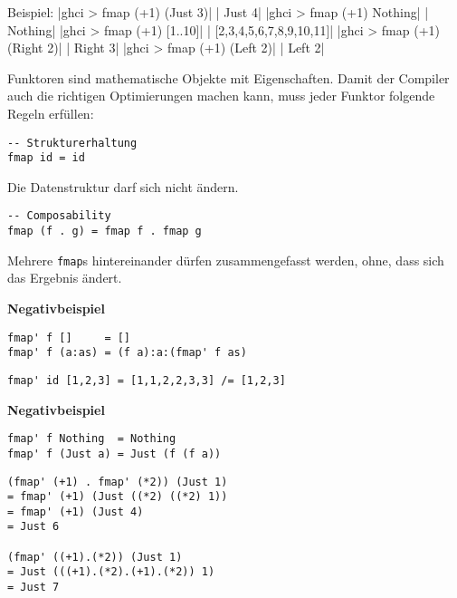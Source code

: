 \documentclass{beamer}
\begin{document}
\begin{frame}[fragile]
Beispiel:
|ghci > fmap (+1) (Just 3)|
\pause
{}|       Just 4|
|ghci > fmap (+1) Nothing|
\pause
{}|       Nothing|
|ghci > fmap (+1) [1..10]|
\pause
{}|       [2,3,4,5,6,7,8,9,10,11]|
|ghci > fmap (+1) (Right 2)|
\pause
{}|       Right 3|
|ghci > fmap (+1) (Left 2)|
\pause
{}|       Left 2|
\end{frame}

\begin{frame}[fragile]
Funktoren sind mathematische Objekte mit Eigenschaften. Damit der Compiler auch die richtigen Optimierungen machen kann, muss jeder Funktor folgende Regeln erfüllen:\\
\pause
\begin{verbatim}
-- Strukturerhaltung
fmap id = id
\end{verbatim}
Die Datenstruktur darf sich nicht ändern.\\
\pause
\bigskip
\begin{verbatim}
-- Composability
fmap (f . g) = fmap f . fmap g
\end{verbatim}
Mehrere \texttt{fmap}s hintereinander dürfen zusammengefasst werden, ohne, dass sich das Ergebnis ändert.
\end{frame}

\begin{frame}[fragile]
\begin{important}\begin{center}\textbf{Negativbeispiel}\end{center}\end{important}
\begin{verbatim}
fmap' f []     = []
fmap' f (a:as) = (f a):a:(fmap' f as)
\end{verbatim}
\pause
\begin{verbatim}
fmap' id [1,2,3] = [1,1,2,2,3,3] /= [1,2,3]
\end{verbatim}
\end{frame}

\begin{frame}[fragile]
\begin{important}\begin{center}\textbf{Negativbeispiel}\end{center}\end{important}
\begin{verbatim}
fmap' f Nothing  = Nothing
fmap' f (Just a) = Just (f (f a))
\end{verbatim}
\pause
\begin{verbatim}
(fmap' (+1) . fmap' (*2)) (Just 1)
= fmap' (+1) (Just ((*2) ((*2) 1))
= fmap' (+1) (Just 4)
= Just 6

(fmap' ((+1).(*2)) (Just 1) 
= Just (((+1).(*2).(+1).(*2)) 1)
= Just 7
\end{verbatim}

\end{frame}
\end{document}
